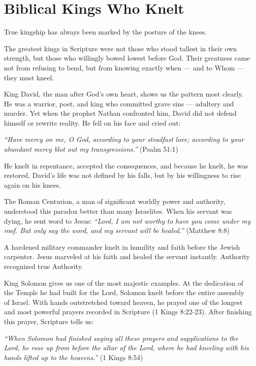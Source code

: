\documentclass[12pt,a4paper]{book}
\begin{document}
\section{Biblical Kings Who Knelt}

True kingship has always been marked by the posture of the knees.

The greatest kings in Scripture were not those who stood tallest in their own strength, but those who willingly bowed lowest before God. Their greatness came not from refusing to bend, but from knowing exactly when — and to Whom — they must kneel.

King David, the man after God’s own heart, shows us the pattern most clearly. He was a warrior, poet, and king who committed grave sins — adultery and murder. Yet when the prophet Nathan confronted him, David did not defend himself or rewrite reality. He fell on his face and cried out:

\textit{“Have mercy on me, O God, according to your steadfast love; according to your abundant mercy blot out my transgressions.”} (Psalm 51:1)

He knelt in repentance, accepted the consequences, and because he knelt, he was restored.  David’s life was not defined by his falls, but by his willingness to rise again on his knees.

The Roman Centurion, a man of significant worldly power and authority, understood this paradox better than many Israelites. When his servant was dying, he sent word to Jesus:
\textit{“Lord, I am not worthy to have you come under my roof. But only say the word, and my servant will be healed.”} (Matthew 8:8)

A hardened military commander knelt in humility and faith before the Jewish carpenter. Jesus marveled at his faith and healed the servant instantly. Authority recognized true Authority.

King Solomon gives us one of the most majestic examples. At the dedication of the Temple he had built for the Lord, Solomon knelt before the entire assembly of Israel.  With hands outstretched toward heaven, he prayed one of the longest and most powerful prayers recorded in Scripture (1 Kings 8:22-23).  After finishing this prayer, Scripture tells us:

\textit{“When Solomon had finished saying all these prayers and supplications to the Lord, he rose up from before the altar of the Lord, where he had kneeling with his hands lifted up to the heavens.”} (1 Kings 8:54)
\end{document}
